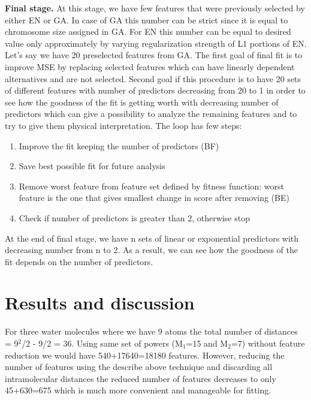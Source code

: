 \documentclass[aps,prl,reprint,amsmath,amssymb,nature]{revtex4-1}
\begin{document}
\textbf{Final stage. }At this stage, we have few features that were 
previously selected by either EN or GA. In case of GA this number can be 
strict since it is equal to chromosome size assigned in GA. For EN this 
number can be equal to desired value only approximately by varying 
regularization strength of L1 portions of EN. Let's say we have 20 
preselected features from GA. The first goal of final fit is to improve 
MSE by replacing selected features which can have linearly dependent 
alternatives and are not selected. Second goal if this procedure is to 
have 20 sets of different features with number of predictors decreasing 
from 20 to 1 in order to see how the goodness of the fit is getting 
worth with decreasing number of predictors which can give a possibility 
to analyze the remaining features and to try to give them physical 
interpretation. The loop has few steps:

\begin{enumerate}
\item Improve the fit keeping the number of predictors (BF)
\item Save best possible fit for future analysis
\item Remove worst feature from feature set defined by fitness function: 
worst feature is the one that gives smallest change in score after 
removing (BE)
\item Check if number of predictors is greater than 2, otherwise stop
\setcounter{numberedCntH}{\theenumi}
\end{enumerate}
At the end of final stage, we have n sets of linear or exponential 
predictors with decreasing number from n to 2. As a result, we can see 
how the goodness of the fit depends on the number of predictors.


\section{Results and discussion}

For three water molecules where we have 9 atoms the total number of 
distances = 9$^{2}$/2 - 9/2 = 36. Using same set of powers (M$_{1
}$=15 and M$_{2}$=7) without feature reduction we would have 
540+17640=18180 features. However, reducing the number of features using 
the describe above technique and discarding all intramolecular distances 
the reduced number of features decreases to only 45+630=675 which is 
much more convenient and manageable for fitting.
\end{document}
